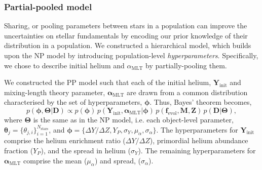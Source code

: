 \documentclass[a4paper,fleqn,usenatbib]{mnras}
\newcommand{\mlt}{\ensuremath{{\alpha_\mathrm{MLT}}}}
\begin{document}
\subsubsection{Partial-pooled model}\label{sec:pp}

Sharing, or pooling parameters between stars in a population can improve the uncertainties on stellar fundamentals by encoding our prior knowledge of their distribution in a population. We constructed a hierarchical model, which builds upon the NP model by introducing population-level \emph{hyperparameters}. Specifically, we chose to describe initial helium and $\mlt$ by partially-pooling them.

We constructed the PP model such that each of the initial helium, $\boldsymbol{Y}_\mathrm{init}$ and mixing-length theory parameter, $\boldsymbol{\alpha}_\mathrm{MLT}$ are drawn from a common distribution characterised by the set of hyperparameters, $\boldsymbol{\phi}$. Thus, Bayes' theorem becomes,
%
\begin{equation}
    p(\boldsymbol{\phi}, \boldsymbol{\Theta} | \boldsymbol{D}) \propto p(\boldsymbol{\phi}) \, p(\boldsymbol{Y}_\mathrm{init}, \boldsymbol{\alpha}_\mathrm{MLT} | \boldsymbol{\phi}) \, p(\boldsymbol{f}_{\mathrm{evol}}, \boldsymbol{M}, \boldsymbol{Z}) \, p(\boldsymbol{D} | \boldsymbol{\Theta}),
    \label{eq:hbmbayes}
\end{equation}
%
where $\boldsymbol{\Theta}$ is the same as in the NP model, i.e. each object-level parameter, $\boldsymbol{\theta}_j = \{\theta_{j, i}\}_{i=1}^{N_\mathrm{stars}}$, and $\boldsymbol{\phi} = \{\Delta Y/\Delta Z, Y_P, \sigma_Y, \mu_\alpha, \sigma_\alpha\}$. The hyperparameters for $\boldsymbol{Y}_\mathrm{init}$ comprise the helium enrichment ratio (${\Delta Y}/{\Delta Z}$), primordial helium abundance fraction ($Y_P$), and the spread in helium ($\sigma_Y$). The remaining hyperparameters for $\boldsymbol{\alpha}_\mathrm{MLT}$ comprise the mean ($\mu_\alpha$) and spread, ($\sigma_\alpha$).
\end{document}
